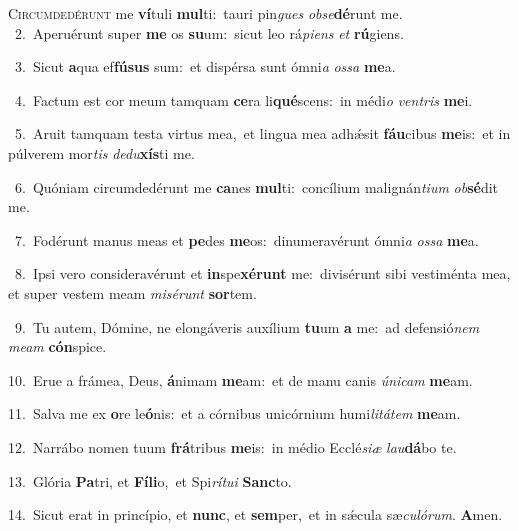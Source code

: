 \lettrine{\initial\textcolor{\initialcolor}{C}}{ircumdedérunt} me \textbf{ví}\-tuli \textbf{mul}\-ti:~\star tauri pin\textit{gues} \textit{ob}\-\textit{se}\textbf{dé}runt me.\\
{\numbfont\textcolor{\numbcolor}{~2.}}~Aperuérunt super \textbf{me} os \textbf{su}\-um:~\star sicut leo rá\-\textit{pi}\-\textit{ens} \textit{et} \textbf{rú}\-giens.\par
{\numbfont\textcolor{\numbcolor}{~3.}}~Sicut \textbf{a}\-qua ef\-\textbf{fú}\-\textbf{sus} sum:~\star et dispérsa sunt ómni\textit{a} \textit{os}\-\textit{sa} \textbf{me}\-a.\par
{\numbfont\textcolor{\numbcolor}{~4.}}~Factum est cor meum tamquam \textbf{ce}\-ra li\-\textbf{qué}\-scens:~\star in médi\textit{o} \textit{ven}\-\textit{tris} \textbf{me}\-i.\par
{\numbfont\textcolor{\numbcolor}{~5.}}~Aruit tamquam testa virtus mea,~\dagger et lingua mea adhǽsit \textbf{fáu}\-cibus \textbf{me}\-is:~\star et in púlverem mor\textit{tis} \textit{de}\-\textit{du}\textbf{xís}ti me.\par
{\numbfont\textcolor{\numbcolor}{~6.}}~Quóniam circumdedérunt me \textbf{ca}\-nes \textbf{mul}\-ti:~\star concílium malignán\-\textit{ti}\-\textit{um} \textit{ob}\-\textbf{sé}dit me.\par
{\numbfont\textcolor{\numbcolor}{~7.}}~Fodérunt manus meas et \textbf{pe}\-des \textbf{me}\-os:~\star dinumeravérunt ómni\textit{a} \textit{os}\-\textit{sa} \textbf{me}\-a.\par
{\numbfont\textcolor{\numbcolor}{~8.}}~Ipsi vero consideravérunt et \textbf{in}\-spe\-\textbf{xé}\-\textbf{runt} me:~\star divisérunt sibi vestiménta mea, et super vestem meam \textit{mi}\-\textit{sé}\textit{runt} \textbf{sor}\-tem.\par
{\numbfont\textcolor{\numbcolor}{~9.}}~Tu autem, Dómine, ne elongáveris auxílium \textbf{tu}\-um \textbf{a} me:~\star ad defensió\textit{nem} \textit{me}\-\textit{am} \textbf{cón}\-spice.\par
{\numbfont\textcolor{\numbcolor}{10.}}~Erue a frámea, Deus, \textbf{á}\-nimam \textbf{me}\-am:~\star et de manu canis \textit{ú}\-\textit{ni}\textit{cam} \textbf{me}\-am.\par
{\numbfont\textcolor{\numbcolor}{11.}}~Salva me ex \textbf{o}\-re le\-\textbf{ó}\-nis:~\star et a córnibus unicórnium humi\-\textit{li}\-\textit{tá}\textit{tem} \textbf{me}\-am.\par
{\numbfont\textcolor{\numbcolor}{12.}}~Narrábo nomen tuum \textbf{frá}\-tribus \textbf{me}\-is:~\star in médio Ecclé\-\textit{si}\-\textit{æ} \textit{lau}\-\textbf{dá}bo te.\par
{\numbfont\textcolor{\numbcolor}{13.}}~Glória \textbf{Pa}\-tri, et \textbf{Fí}\-\textbf{li}o,~\star et Spi\-\textit{rí}\-\textit{tu}\textit{i} \textbf{Sanc}\-to.\par
{\numbfont\textcolor{\numbcolor}{14.}}~Sicut erat in princípio, et \textbf{nunc}\-, et \textbf{sem}\-per,~\star et in sǽcula sæ\-\textit{cu}\-\textit{ló}\textit{rum}. \textbf{A}\-men.\par
